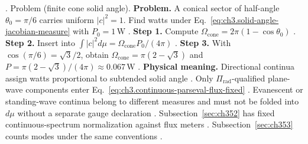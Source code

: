 \cite{stratton1941}.
Problem (finite cone solid angle). \textbf{Problem.} A conical sector of half-angle \(\theta_{0}=\pi/6\) carries uniform \(|c|^{2}=1\). Find watts under
Eq.~\eqref{eq:ch3.solid-angle-jacobian-measure} with \(P_{0}=1\,\mathrm{W}\) \cite{jackson1999}.
\textbf{Step 1.} Compute \(\Omega_{\mathrm{cone}}=2\pi(1-\cos\theta_{0})\) \cite{jackson1999}.
\textbf{Step 2.} Insert into \(\int|c|^{2}d\mu=\Omega_{\mathrm{cone}}P_{0}/(4\pi)\) \cite{hansen1988}.
\textbf{Step 3.} With \(\cos(\pi/6)=\sqrt{3}/2\), obtain \(\Omega_{\mathrm{cone}}=\pi(2-\sqrt{3})\) and
\(P=\pi(2-\sqrt{3})/(4\pi)\approx0.067\,\mathrm{W}\) \cite{harrington2001}.
\textbf{Physical meaning.} Directional continua assign watts proportional to subtended solid angle \cite{stratton1941}.
Only \(\Pi_{\mathrm{rad}}\)-qualified plane-wave components enter Eq.~\eqref{eq:ch3.continuous-parseval-flux-fixed}
\cite{harrington2001}. Evanescent or standing-wave continua belong to different measures and must not be
folded into \(d\mu\) without a separate gauge declaration \cite{hansen1988}.
Subsection~\ref{sec:ch352} has fixed continuous-spectrum normalization against flux meters
\cite{stratton1941}. Subsection~\ref{sec:ch353} counts modes under the same conventions
\cite{hansen1988}.
